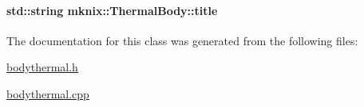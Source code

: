 \hypertarget{classmknix_1_1_thermal_body_ad1b2b790274d2c987a8c461da0a3282f}{
\paragraph[{title}]{\setlength{\rightskip}{0pt plus 5cm}std\-::string mknix\-::\-Thermal\-Body\-::title\hspace{0.3cm}{\ttfamily [protected]}}}\label{classmknix_1_1_thermal_body_ad1b2b790274d2c987a8c461da0a3282f}


The documentation for this class was generated from the following files\-:\begin{DoxyCompactItemize}
\item 
\hyperlink{bodythermal_8h}{bodythermal.\-h}\item 
\hyperlink{bodythermal_8cpp}{bodythermal.\-cpp}\end{DoxyCompactItemize}
